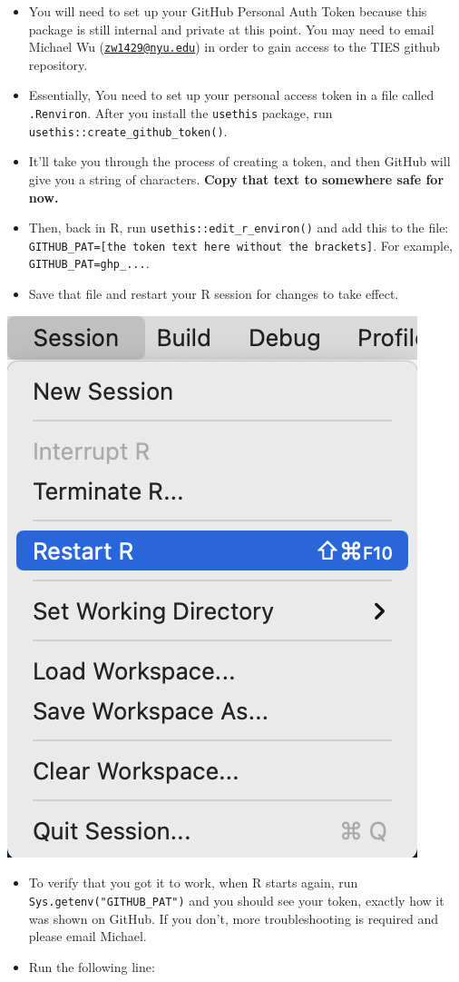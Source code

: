 \documentclass[
]{book}
\begin{document}
\begin{itemize}
\item
  You will need to set up your GitHub Personal Auth Token because this package is still internal and private at this point. You may need to email Michael Wu (\href{mailto:zw1429@nyu.edu}{\nolinkurl{zw1429@nyu.edu}}) in order to gain access to the TIES github repository.
\item
  Essentially, You need to set up your personal access token in a file called \texttt{.Renviron}. After you install the \texttt{usethis} package, run \texttt{usethis::create\_github\_token()}.
\item
  It'll take you through the process of creating a token, and then GitHub will give you a string of characters. \textbf{Copy that text to somewhere safe for now.}
\item
  Then, back in R, run \texttt{usethis::edit\_r\_environ()} and add this to the file: \texttt{GITHUB\_PAT={[}the\ token\ text\ here\ without\ the\ brackets{]}}. For example, \texttt{GITHUB\_PAT=ghp\_...}.
\item
  Save that file and restart your R session for changes to take effect.
\end{itemize}

\begin{center}\includegraphics[width=0.66\linewidth]{images/restart_R} \end{center}

\begin{itemize}
\item
  To verify that you got it to work, when R starts again, run \texttt{Sys.getenv("GITHUB\_PAT")} and you should see your token, exactly how it was shown on GitHub. If you don't, more troubleshooting is required and please email Michael.
\item
  Run the following line:
\end{itemize}
\end{document}

